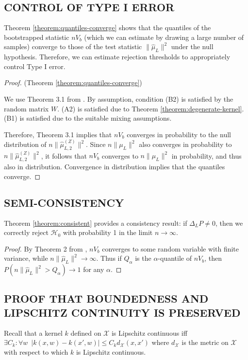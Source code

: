 \documentclass[]{article}
\begin{document}
\subsection{CONTROL OF TYPE I ERROR}\label{supp:quantile-proof}
Theorem \ref{theorem:quantiles-converge} shows that the quantiles of the bootstrapped statistic $nV_b$ (which we can estimate by drawing a large number of samples) converge to those of the test statistic $\|\hat \mu_L\|^2$ under the null hypothesis. Therefore, we can estimate rejection thresholds to appropriately control Type I error.

\begin{proof}(Theorem \ref{theorem:quantiles-converge})

We use Theorem 3.1 from \citet{leucht2013dependent}. By assumption, condition (B2) is satisfied by the random matrix $W$. (A2) is satisfied due to Theorem \ref{theorem:degenerate-kernel}. (B1) is satisfied due to the suitable mixing assumptions.

Therefore, Theorem 3.1 implies that $nV_b$ converges in probability to the null distribution of $n\|\hat \mu_{L,2}^{(Z)}\|^2$. Since $n\|\mu_L\|^2$ also converges in probability to $n\|\hat \mu_{L,2}^{(Z)}\|^2$, it follows that $nV_b$ converges to $n\|\mu_L\|^2$ in probability, and thus also in distribution. Convergence in distribution implies that the quantiles converge.
\end{proof} 



\subsection{SEMI-CONSISTENCY}\label{supp:consistent}
Theorem \ref{theorem:consistent} provides a consistency result: if $\Delta_LP\not = 0$, then we correctly reject $\mathcal{H}_0$ with probability 1 in the limit $n\longrightarrow\infty$.

\begin{proof}
By Theorem 2 from \citet{chwialkowski2014wild}, $nV_b$ converges to some random variable with finite variance, while $n\|\hat{\mu}_L\|^2 \longrightarrow \infty$. Thus if $Q_\alpha$ is the $\alpha$-quantile of $nV_b$, then $P(n\|\hat{\mu}_L\|^2 > Q_\alpha) \longrightarrow 1 $ for any $\alpha$.
\end{proof}

\subsection{PROOF THAT BOUNDEDNESS AND LIPSCHITZ CONTINUITY IS PRESERVED}\label{supp:bounded-and-lipschitz}
Recall that a kernel $k$ defined on $\mathcal{X}$ is Lipschitz continuous iff $\exists C_k : \forall w \enspace |k(x,w) - k(x',w)| \leq C_k d_\mathcal{X}(x,x')$ where $d_\mathcal{X}$ is the metric on $\mathcal{X}$ with respect to which $k$ is Lipschitz continuous.
\end{document}
